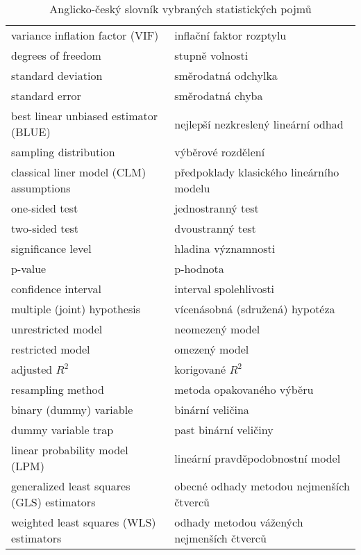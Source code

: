 \begin{table}
\begin{center}
\begin{tabular}{l l}
variance inflation factor (VIF) & inflační faktor rozptylu\\
degrees of freedom & stupně volnosti\\
standard deviation & směrodatná odchylka\\
standard error & směrodatná chyba\\
best linear unbiased estimator (BLUE) & nejlepší nezkreslený lineární odhad\\
sampling distribution & výběrové rozdělení\\
classical liner model (CLM) assumptions & předpoklady klasického lineárního modelu\\
one-sided test & jednostranný test\\
two-sided test & dvoustranný test\\
significance level & hladina významnosti\\
p-value & p-hodnota\\
confidence interval & interval spolehlivosti\\
multiple (joint) hypothesis & vícenásobná (sdružená) hypotéza\\
unrestricted model & neomezený model\\
restricted model & omezený model\\
adjusted $R^2$ & korigované $R^2$\\
resampling method & metoda opakovaného výběru\\
binary (dummy) variable & binární veličina\\
dummy variable trap & past binární veličiny\\
linear probability model (LPM) & lineární pravděpodobnostní model\\
generalized least squares (GLS) estimators & obecné odhady metodou nejmenších čtverců\\
weighted least squares (WLS) estimators & odhady metodou vážených nejmenších čtverců\\
\end{tabular}
\caption{Anglicko-český slovník vybraných statistických pojmů}
\end{center}
\end{table}

